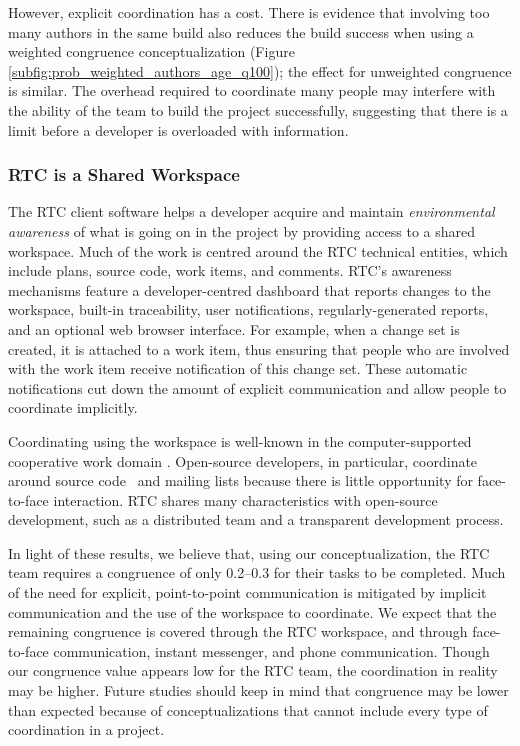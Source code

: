 However, explicit coordination has a cost. There is evidence that involving too many authors in the same build also reduces the build success when using a weighted congruence conceptualization (Figure \ref{subfig:prob_weighted_authors_age_q100}); the effect for unweighted congruence is similar. The overhead required to coordinate many people may interfere with the ability of the team to build the project successfully, suggesting that there is a limit before a developer is overloaded with information.

\subsubsection{RTC is a Shared Workspace}
The RTC client software helps a developer acquire and maintain \emph{environmental awareness} of what is going on in the project by providing access to a shared workspace. Much of the work is centred around the RTC technical entities, which include plans, source code, work items, and comments.
RTC's awareness mechanisms feature a developer-centred dashboard that reports changes to the workspace, built-in traceability, user notifications, regularly-generated reports, and an optional web browser interface. For example, when a change set is created, it is attached to a work item, thus ensuring that people who are involved with the work item receive notification of this change set. These automatic notifications cut down the amount of explicit communication and allow people to coordinate implicitly.

Coordinating using the workspace is well-known in the computer-supported cooperative work domain \cite{schmidt1996}. Open-source developers, in particular, coordinate around source code~\cite{bolici:stc:2009} and mailing lists \cite{gutwin2004:awareness,mockus2002:opensource} because there is little opportunity for face-to-face interaction. RTC shares many characteristics with open-source development, such as a distributed team and a transparent development process.

In light of these results, we believe that, using our conceptualization, the RTC team requires a congruence of only 0.2--0.3 for their tasks to be completed.
Much of the need for explicit, point-to-point communication is mitigated by implicit communication and the use of the workspace to coordinate.
We expect that the remaining congruence is covered through the RTC workspace, and through face-to-face communication, instant messenger, and phone communication. Though our congruence value appears low for the RTC team, the coordination in reality may be higher. Future studies should keep in mind that congruence may be lower than expected because of conceptualizations that cannot include every type of coordination in a project.

